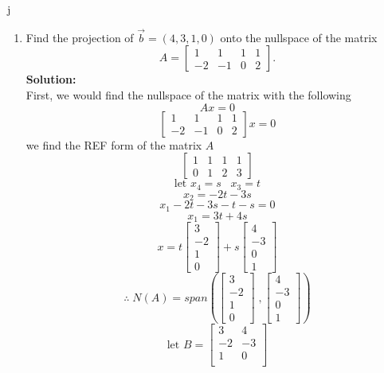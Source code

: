 j\documentclass[12pt]{article}
\begin{document}
\begin{enumerate}
	\item  Find the projection of $\vec b=(4,3,1,0)$ onto the nullspace of the matrix 
	\[A=\begin{bmatrix} 1&1&1&1\\-2&-1&0&2\end{bmatrix} .\]
        \textbf{Solution:}\\
        First, we would find the nullspace of the matrix with the following
        \[
        Ax=0
        \]
        \[
        \begin{bmatrix} 1&1&1&1\\-2&-1&0&2\end{bmatrix}x=0
        \]
        we find the REF form of the matrix $A$
        \[
        \begin{bmatrix}
            1&1&1&1\\
            0&1&2&3
        \end{bmatrix}
        \]
        \[
        \text{let }x_4 = s \;\;\; x_3=t
        \]
        \[
        x_2=-2t-3s
        \]
        \[
        x_1 -2t-3s-t-s=0
        \]
        \[
        x_1=3t+4s
        \]
        \[
        x=
        t
        \begin{bmatrix}
            3\\-2\\1\\0
        \end{bmatrix}
        +s
        \begin{bmatrix}
            4\\-3\\0\\1
        \end{bmatrix}
        \]
        \[
        \therefore \; N(A)= span \left(
        \begin{bmatrix}
            3\\-2\\1\\0
        \end{bmatrix}
        \;,
        \begin{bmatrix}
            4\\-3\\0\\1
        \end{bmatrix}
        \right)
        \]
        \[
        \text{let }B=
        \begin{bmatrix}
            3&4\\
            -2&-3\\
            1&0\\

\end{bmatrix}\]
\end{enumerate}
\end{document}
